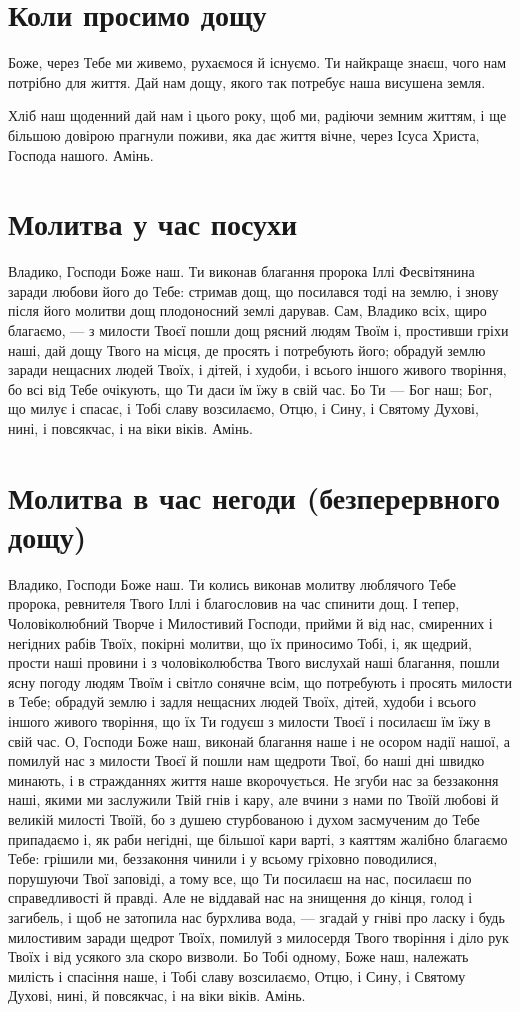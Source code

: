 \documentclass[chapters.tex]{subfiles}
\begin{document}
\section{Коли просимо дощу}
Боже, через Тебе ми живемо, рухаємося й існуємо. Ти найкраще знаєш, чого нам потрібно для життя. Дай нам дощу, якого так потребує наша висушена земля.

Хліб наш щоденний дай нам і цього року, щоб ми, радіючи земним життям, і ще більшою довірою прагнули поживи, яка дає життя вічне, через Ісуса Христа, Господа нашого. Амінь.

\section{Молитва у час посухи}
Владико, Господи Боже наш. Ти виконав благання пророка Іллі Фесвітянина заради любови його до Тебе: стримав дощ, що посилався тоді на землю, і знову після його молитви дощ плодоносний землі дарував. Сам, Владико всіх, щиро благаємо, — з милости Твоєї пошли дощ рясний людям Твоїм і, простивши гріхи наші, дай дощу Твого на місця, де просять і потребують його; обрадуй землю заради нещасних людей Твоїх, і дітей, і худоби, і всього іншого живого творіння, бо всі від Тебе очікують, що Ти даси їм їжу в свій час. Бо Ти — Бог наш; Бог, що милує і спасає, і Тобі славу возсилаємо, Отцю, і Сину, і Святому Духові, нині, і повсякчас, і на віки віків. Амінь.

\section{Молитва в час негоди (безперервного дощу)}
Владико, Господи Боже наш. Ти колись виконав молитву люблячого Тебе пророка, ревнителя Твого Іллі і благословив на час спинити дощ. І тепер, Чоловіколюбний Творче і Милостивий Господи, прийми й від нас, смиренних і негідних рабів Твоїх, покірні молитви, що їх приносимо Тобі, і, як щедрий, прости наші провини і з чоловіколюбства Твого вислухай наші благання, пошли ясну погоду людям Твоїм і світло сонячне всім, що потребують і просять милости в Тебе; обрадуй землю і задля нещасних людей Твоїх, дітей, худоби і всього іншого живого творіння, що їх Ти годуєш з милости Твоєї і посилаєш їм їжу в свій час. О, Господи Боже наш, виконай благання наше і не осором надії нашої, а помилуй нас з милости Твоєї й пошли нам щедроти Твої, бо наші дні швидко минають, і в стражданнях життя наше вкорочується. Не згуби нас за беззаконня наші, якими ми заслужили Твій гнів і кару, але вчини з нами по Твоїй любові й великій милості Твоїй, бо з душею стурбованою і духом засмученим до Тебе припадаємо і, як раби негідні, ще більшої кари варті, з каяттям жалібно благаємо Тебе: грішили ми, беззаконня чинили і у всьому гріховно поводилися, порушуючи Твої заповіді, а тому все, що Ти посилаєш на нас, посилаєш по справедливості й правді. Але не віддавай нас на знищення до кінця, голод і загибель, і щоб не затопила нас бурхлива вода, — згадай у гніві про ласку і будь милостивим заради щедрот Твоїх, помилуй з милосердя Твого творіння і діло рук Твоїх і від усякого зла скоро визволи. Бо Тобі одному, Боже наш, належать милість і спасіння наше, і Тобі славу возсилаємо, Отцю, і Сину, і Святому Духові, нині, й повсякчас, і на віки віків. Амінь.
\end{document}
